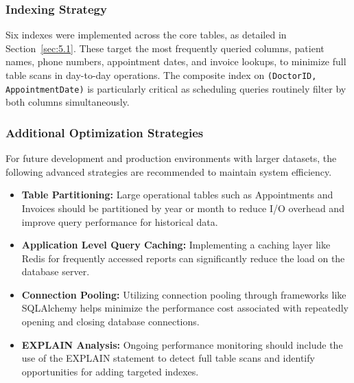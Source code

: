 \subsubsection*{Indexing Strategy}
Six indexes were implemented across the core tables, as detailed in Section~\ref{sec:5.1}. These target the most frequently queried columns, patient names, phone numbers, appointment dates, and invoice lookups, to minimize full table scans in day-to-day operations. The composite index on \texttt{(DoctorID, AppointmentDate)} is particularly critical as scheduling queries routinely filter by both columns simultaneously.

\subsubsection*{Additional Optimization Strategies}
For future development and production environments with larger datasets, the following advanced strategies are recommended to maintain system efficiency.

\begin{itemize}
    \item \textbf{Table Partitioning:} Large operational tables such as Appointments and Invoices should be partitioned by year or month to reduce I/O overhead and improve query performance for historical data.
    \item \textbf{Application Level Query Caching:} Implementing a caching layer like Redis for frequently accessed reports can significantly reduce the load on the database server.
    \item \textbf{Connection Pooling:} Utilizing connection pooling through frameworks like SQLAlchemy helps minimize the performance cost associated with repeatedly opening and closing database connections.
    \item \textbf{EXPLAIN Analysis:} Ongoing performance monitoring should include the use of the EXPLAIN statement to detect full table scans and identify opportunities for adding targeted indexes.
\end{itemize}

